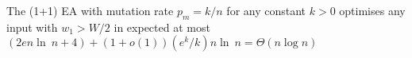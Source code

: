 
\begin{lemma}
      The (1+1) EA with mutation rate $p_m=k/n$ for any constant $k>0$ optimises any input with $w_1>W/2$ in expected at most $(2en\ln~n+4) + (1+o(1))(e^k/k)n\ln~n = \Theta(n\log{}n)$ 
\end{lemma}
